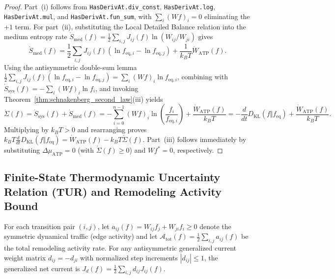 \documentclass[11pt,a4paper]{article}
\theoremstyle{definition}
\begin{document}
\begin{proof}
Part~(i) follows from \texttt{HasDerivAt.div\_const}, \texttt{HasDerivAt.log}, \texttt{HasDerivAt.mul}, and \texttt{HasDerivAt.fun\_sum}, with $\sum_i (Wf)_i = 0$ eliminating the $+1$ term. For part~(ii), substituting the Local Detailed Balance relation into the medium entropy rate $\dot{S}_{\mathrm{med}}(f) = \frac{1}{2}\sum_{i,j} J_{ij}(f)\ln(W_{ij}/W_{ji})$ gives
\[
  \dot{S}_{\mathrm{med}}(f) = \frac{1}{2}\sum_{i,j} J_{ij}(f)\left(\ln f_{\mathrm{eq},i} - \ln f_{\mathrm{eq},j}\right) + \frac{1}{k_B T}\dot{W}_{\mathrm{ATP}}(f).
\]
Using the antisymmetric double-sum lemma $\frac{1}{2}\sum_{i,j} J_{ij}(f)(\ln f_{\mathrm{eq},i} - \ln f_{\mathrm{eq},j}) = \sum_i (Wf)_i \ln f_{\mathrm{eq},i}$, combining with $\dot{S}_{\mathrm{sys}}(f) = -\sum_i (Wf)_i \ln f_i$, and invoking Theorem~\ref{thm:schnakenberg_second_law}(iii) yields
\[
  \dot{\Sigma}(f) = \dot{S}_{\mathrm{sys}}(f) + \dot{S}_{\mathrm{med}}(f) = -\sum_{i=0}^{n-1} (Wf)_i \ln\!\left(\frac{f_i}{f_{\mathrm{eq},i}}\right) + \frac{\dot{W}_{\mathrm{ATP}}(f)}{k_B T} = -\frac{d}{dt}D_{\mathrm{KL}}(f\Vert f_{\mathrm{eq}}) + \frac{\dot{W}_{\mathrm{ATP}}(f)}{k_B T}.
\]
Multiplying by $k_B T > 0$ and rearranging proves $k_B T \frac{d}{dt}D_{\mathrm{KL}}(f\Vert f_{\mathrm{eq}}) = \dot{W}_{\mathrm{ATP}}(f) - k_B T\dot{\Sigma}(f)$. Part~(iii) follows immediately by substituting $\Delta\mu_{\mathrm{ATP}} = 0$ (with $\dot{\Sigma}(f) \ge 0$) and $Wf^* = 0$, respectively.
\end{proof}

\subsection{Finite-State Thermodynamic Uncertainty Relation (TUR) and Remodeling Activity Bound}

For each transition pair $(i,j)$, let $a_{ij}(f) = W_{ij}f_j + W_{ji}f_i \ge 0$ denote the symmetric dynamical traffic (edge activity) and let $\mathcal{A}_{\mathrm{tot}}(f) = \frac{1}{2}\sum_{i,j} a_{ij}(f)$ be the total remodeling activity rate. For any antisymmetric generalized current weight matrix $d_{ij} = -d_{ji}$ with normalized step increments $|d_{ij}| \le 1$, the generalized net current is $J_d(f) = \frac{1}{2}\sum_{i,j} d_{ij} J_{ij}(f)$.
\end{document}
